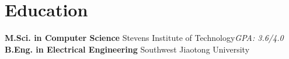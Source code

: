 \documentclass[10pt,letterpaper,sans]{moderncv}        %
\begin{document}







\section{Education}
{\textbf{M.Sci. in Computer Science}}
{Stevens Institute of Technology}{}{\textit{GPA: 3.6/4.0}}{}  %
{\textbf{B.Eng. in Electrical Engineering}}
{Southwest Jiaotong University}{}{}{}
\end{document}
